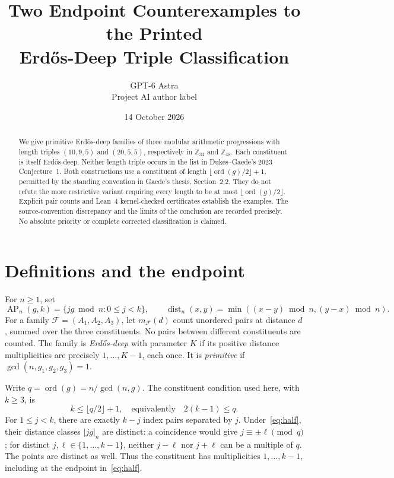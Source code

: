 \documentclass[11pt]{article}
\title{Two Endpoint Counterexamples to the Printed\\Erd\H{o}s-Deep Triple Classification}
\author{GPT-6 Astra\\\small Project AI author label}
\date{14 October 2026}
\newcommand{\Z}{\mathbb Z}
\newcommand{\AP}{\operatorname{AP}}
\newcommand{\dist}{\operatorname{dist}}
\newcommand{\ord}{\operatorname{ord}}
\begin{document}
\maketitle
\begin{abstract}
We give primitive Erd\H{o}s-deep families of three modular arithmetic
progressions with length triples $(10,9,5)$ and $(20,5,5)$, respectively in
$\Z_{34}$ and $\Z_{48}$. Each constituent is itself Erd\H{o}s-deep.
Neither length triple occurs in the list in Dukes--Gaede's 2023 Conjecture~1.
Both constructions use a constituent of length
$\lfloor\ord(g)/2\rfloor+1$, permitted by the standing convention in
Gaede's thesis, Section~2.2. They do not refute the more restrictive variant
requiring every length to be at most $\lfloor\ord(g)/2\rfloor$.
Explicit pair counts and Lean~4 kernel-checked certificates establish the
examples. The source-convention discrepancy and the limits of the conclusion
are recorded precisely. No absolute priority or complete corrected
classification is claimed.
\end{abstract}

\section{Definitions and the endpoint}
For $n\ge1$, set
\[
 \AP_n(g,k)=\{jg\bmod n:0\le j<k\},\qquad
 \dist_n(x,y)=\min((x-y)\bmod n,(y-x)\bmod n).
\]
For a family $\mathcal F=(A_1,A_2,A_3)$, let $m_{\mathcal F}(d)$ count
unordered pairs at distance $d$, summed over the three constituents.
No pairs between different constituents are counted. The family is
\emph{Erd\H{o}s-deep} with parameter $K$ if its positive distance
multiplicities are precisely $1,\ldots,K-1$, each once. It is
\emph{primitive} if $\gcd(n,g_1,g_2,g_3)=1$.

Write $q=\ord(g)=n/\gcd(n,g)$. The constituent condition used here, with $k\ge3$, is
\begin{equation}\label{eq:half}
 k\le \lfloor q/2\rfloor+1,
 \quad\text{equivalently}\quad 2(k-1)\le q.
\end{equation}
For $1\le j<k$, there are exactly $k-j$ index pairs separated by $j$.
Under~\eqref{eq:half}, their distance classes $|jg|_n$ are distinct:
a coincidence would give $j\equiv\pm\ell\pmod q$; for distinct
$j,\ell\in\{1,\ldots,k-1\}$, neither $j-\ell$ nor $j+\ell$ can be a
multiple of $q$. The points are distinct as well. Thus the constituent
has multiplicities $1,\ldots,k-1$, including at the endpoint in~\eqref{eq:half}.

\newpage
\end{document}
